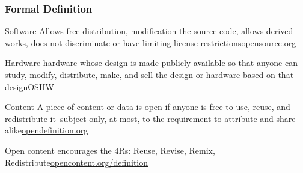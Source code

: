 \documentclass{beamer}
\begin{document}
\begin{frame}
  \frametitle{Formal Definition}
  \begin{center}
    \begin{block}{Software}
      Allows free distribution, modification the source code, allows
      derived works, does not discriminate or have limiting license
      restrictions\textemdash\textcolor{beamer@myblue}{\href{http://opensource.org/docs/osd}{opensource.org}}
    \end{block}

    \begin{block}{Hardware}
      hardware whose design is made publicly available so that anyone
      can study, modify, distribute, make, and sell the design or
      hardware based on that design\textemdash\textcolor{beamer@myblue}{\href{http://freedomdefined.org/OSHW}{OSHW}}
    \end{block}

    \begin{block}{Content}
      A piece of content or data is open if anyone is free to use,
      reuse, and redistribute it--subject only, at most, to the
      requirement to attribute and
      share-alike\textemdash\textcolor{beamer@myblue}{\href{http://www.opendefinition.org/}{opendefinition.org}}

      \vspace{1em}
      
      Open content encourages the 4Rs: Reuse, Revise, Remix,
      Redistribute\textemdash\textcolor{beamer@myblue}{\href{http://www.opencontent.org/definition/}{opencontent.org/definition}}
    \end{block}
  \end{center}
\end{frame}
\end{document}
